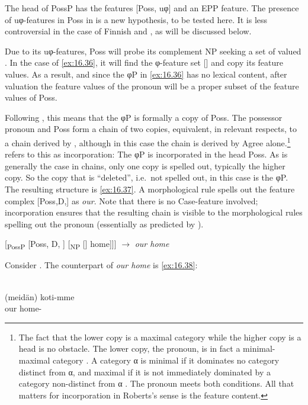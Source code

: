 \documentclass[output=paper]{langsci/langscibook}
\begin{document}
The head of PossP has the features [Poss, uφ] and an \gls{EPP} feature. The presence of uφ-features in Poss in 
is a new hypothesis, to be tested here. It is less controversial in the case of
Finnish and , as will be discussed below.

Due to its uφ-features, Poss will probe its complement NP seeking a set of
valued . In the case of \eqref{ex:16.36}, it will find the φ-feature set [\Fpl{}]
and copy its feature values. As a result, and since the φP in \eqref{ex:16.36} has no
lexical content, after valuation the feature values of the pronoun will be a
proper subset of the feature values of Poss.

Following \textcite{Roberts2010,Roberts2010b}, this means that the φP is formally a copy of Poss.
The possessor pronoun and Poss form a chain of two copies, equivalent, in
relevant respects, to a chain derived by , although in this case the
chain is derived by Agree alone.\footnote{The fact that the lower copy is a
    maximal category while the higher copy is a head is no obstacle. The lower
    copy, the pronoun, is in fact a minimal-maximal category
    \citep[249]{Chomsky1995}. A category α is minimal if it dominates no
    category distinct from α, and maximal if it is not immediately
    dominated by a category non-distinct from α
    \citep[54--56]{Roberts2010}. The pronoun meets both conditions. All that
matters for incorporation in Roberts’s sense is the feature
content.\label{fn:16.19}} \textcite{Roberts2010,Roberts2010b} refers to this as incorporation: The φP is incorporated in the head
Poss. As is generally the case in chains, only one copy is spelled out,
typically the higher copy. So the copy that is \enquote{deleted}, i.e.\  not
spelled out, in this case is the φP. The resulting structure is
\eqref{ex:16.37}. A morphological rule spells out the feature complex
[Poss,D,\Fpl{}] as \emph{our}. Note that there is no Case-feature involved;
incorporation ensures that the resulting chain is visible to the morphological
rules spelling out the pronoun (essentially as predicted by
\citealt[117--119]{Baker1988}).

\ea\label{ex:16.37}
    {}[\textsubscript{PossP} [Poss, D, \Fpl{}] [\textsubscript{NP} [\sout{\Fpl}]
        home]]] $\rightarrow$ \emph{our home}
\z

Consider . The counterpart of \emph{our home} is \eqref{ex:16.38}:

\ea\label{ex:16.38} \\
    \gll (meidän) koti-mme\\
        \hphantom{(}our home-\Fpl{}\\
\z
\end{document}

